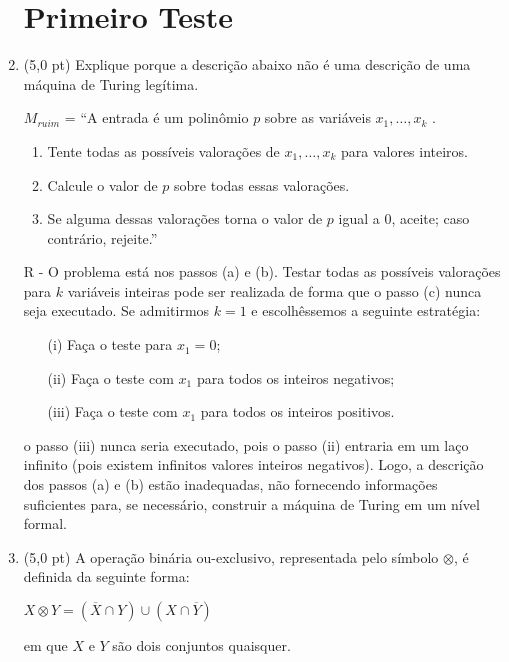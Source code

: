 \documentclass[12pt,a4paper,oneside]{article}
\begin{document}
\begin{enumerate}
	
	\section*{Primeiro Teste}
	
	\item (5,0 pt) Explique porque a descrição abaixo não é uma descrição de uma máquina de Turing legítima.
	
$M_{ruim}$ = ``A entrada é um polinômio $p$ sobre as variáveis $x_1, \ldots, x_k$ .
	\begin{enumerate}
		\item Tente todas as possíveis valorações de $x_1, \ldots, x_k$ para valores inteiros.
		\item Calcule o valor de $p$ sobre todas essas valorações.
		\item Se alguma dessas valorações torna o valor de $p$ igual a 0, aceite; caso contrário, rejeite.''
	\end{enumerate}
	
	{ \color{verde}
	R - O problema está nos passos (a) e (b). Testar todas as possíveis valorações para $k$ variáveis inteiras pode ser realizada de forma que o passo (c) nunca seja executado. Se admitirmos $k=1$ e escolhêssemos a seguinte estratégia:
		\begin{enumerate}
			\item[(i)] Faça o teste para $x_1 = 0$;
			\item[(ii)] Faça o teste com $x_1$ para todos os inteiros negativos;
			\item[(iii)] Faça o teste com $x_1$ para todos os inteiros positivos.
		\end{enumerate}		 
		o passo (iii) nunca seria executado, pois o passo (ii) entraria em um laço infinito (pois existem infinitos valores inteiros negativos). Logo, a descrição dos passos (a) e (b) estão inadequadas, não fornecendo informações suficientes para, se necessário, construir a máquina de Turing em um nível formal.
	}
	
	\newpage
	
	\item (5,0 pt) A operação binária ou-exclusivo, representada pelo símbolo $\otimes$, é definida da seguinte forma:
		\begin{center}
			$X \otimes Y = (\overline{X} \cap Y) \cup (X \cap \overline{Y})$
		\end{center}
		em que $X$ e $Y$ são dois conjuntos quaisquer.
				 

\end{enumerate}
\end{document}
